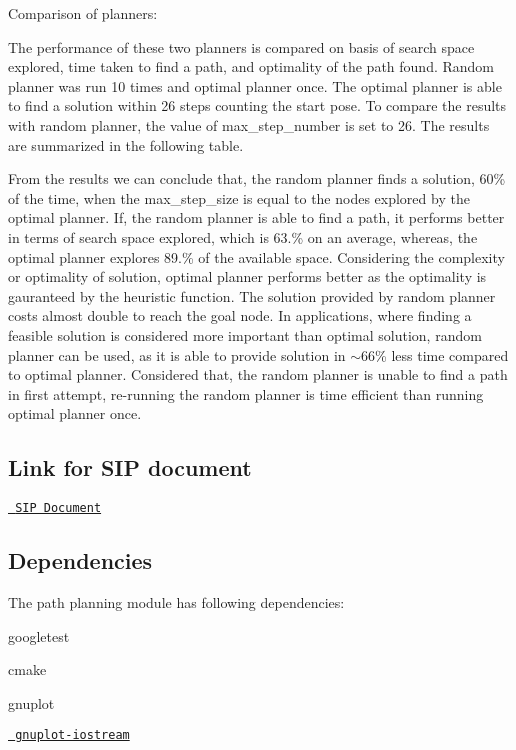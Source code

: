 Comparison of planners\+:

The performance of these two planners is compared on basis of search space explored, time taken to find a path, and optimality of the path found. Random planner was run 10 times and optimal planner once. The optimal planner is able to find a solution within 26 steps counting the start pose. To compare the results with random planner, the value of max\+\_\+step\+\_\+number is set to 26. The results are summarized in the following table.

 

From the results we can conclude that, the random planner finds a solution, 60\% of the time, when the max\+\_\+step\+\_\+size is equal to the nodes explored by the optimal planner. If, the random planner is able to find a path, it performs better in terms of search space explored, which is 63.\% on an average, whereas, the optimal planner explores 89.\% of the available space. Considering the complexity or optimality of solution, optimal planner performs better as the optimality is gauranteed by the heuristic function. The solution provided by random planner costs almost double to reach the goal node. In applications, where finding a feasible solution is considered more important than optimal solution, random planner can be used, as it is able to provide solution in $\sim$66\% less time compared to optimal planner. Considered that, the random planner is unable to find a path in first attempt, re-\/running the random planner is time efficient than running optimal planner once.

\subsection*{Link for S\+IP document}

\href{https://docs.google.com/spreadsheets/d/1OKOs_5UbBNU4q0WjCL7nKXChtRCFgHgl8hptJVIeyFo/edit?usp=sharing}\texttt{ S\+IP Document}

\subsection*{Dependencies}

The path planning module has following dependencies\+:
\begin{DoxyEnumerate}
\item googletest
\item cmake
\item gnuplot
\item \href{http://stahlke.org/dan/gnuplot-iostream/}\texttt{ gnuplot-\/iostream}
\end{DoxyEnumerate}


